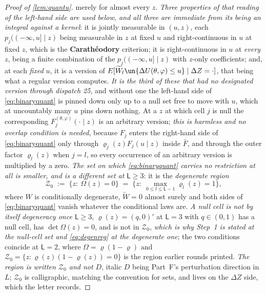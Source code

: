 \begin{proof}[Proof of \cref{lem:quantu}]
merely for almost every $z$. \emph{Three properties of that reading of the left-hand side are used
below, and all three are immediate from its being an integral against a kernel}: it is jointly
measurable in $(u,z)$, each $p_j((-\infty,u]\mid z)$ being measurable in $z$ at fixed $u$ and
right-continuous in $u$ at fixed $z$, which is the \textbf{Carath\'eodory} criterion; it is
right-continuous in $u$ at \emph{every} $z$,
being a finite combination of the $p_j((-\infty,u]\mid z)$ with $z$-only coefficients; and, at each
\emph{fixed} $u$, it is a version of
$E[\widetilde W_l\un\{\Delta U(\theta,\varphi)\le u\}\mid\Delta Z=\cdot]$, that being what a regular
version computes. \emph{It is the third of these that had no designated version through
dispatch 25}, and without one the left-hand side of \eqref{eq:binaryquant} is pinned down only up to a
null set free to move with $u$, which at uncountably many $u$ pins down nothing.
At a $z$ at which cell $j$ is null the corresponding
$F_j^{(\theta,\varphi)}(\cdot\mid z)$ is an arbitrary version; \emph{this is harmless and no overlap
condition is needed}, because $F_j$ enters the right-hand side of \eqref{eq:binaryquant} only through
$\varrho_j(z)F_j(u\mid z)$ inside $\bar F$, and through the outer factor $\varrho_l(z)$ when $j=l$, so
every occurrence of an arbitrary version is multiplied by a zero.
\emph{The set on which \eqref{eq:binaryquant} carries no restriction at all is smaller, and is a
different set at $\mathsf L\ge3$}: it is the \emph{degenerate region}
\begin{equation}\label{eq:degenreg}
\mathcal Z_0\;:=\;\big\{z:\ \Omega(z)=0\big\}\;=\;\big\{z:\ \max_{0\le l\le\mathsf L-1}\varrho_l(z)=1\big\},
\end{equation}
where $W$ is conditionally degenerate, $\widetilde W=0$ almost surely and both sides of
\eqref{eq:binaryquant} vanish whatever the conditional laws are.
\emph{A null cell is not by itself degeneracy once $\mathsf L\ge3$}, $\varrho(z)=(q,0)'$ at
$\mathsf L=3$ with $q\in(0,1)$ has a null cell, has $\det\Omega(z)=0$, and is not in $\mathcal Z_0$, 
\emph{which is why Step~1 is stated at the null-cell set and \eqref{eq:degenreg} at the degenerate one};
the two conditions coincide at $\mathsf L=2$, where $\Omega=\varrho(1-\varrho)$ and
$\mathcal Z_0=\{z:\varrho(z)(1-\varrho(z))=0\}$ is the region earlier rounds printed.
\emph{The region is written $\mathcal Z_0$ and not $D$}, italic $D$ being Part~F's perturbation
direction in $L$; $\mathcal Z_0$ is calligraphic, matching the convention for sets, and lives on the
$\Delta Z$ side, which the letter records.

\end{proof}
